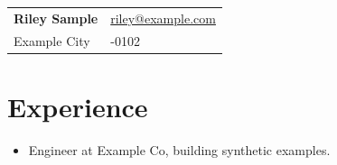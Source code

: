 \documentclass[11pt,letterpaper]{article}
\begin{document}
\noindent\begin{tabularx}{\textwidth}{>{\raggedright\arraybackslash}X >{\raggedleft\arraybackslash}X}
\textbf{\Large Riley Sample} & \href{mailto:riley@example.com}{riley@example.com} \\
Example City & 555-0102 \\
\end{tabularx}
\section*{Experience}
\begin{itemize}[leftmargin=*]
\item Engineer at Example Co, building synthetic examples.
\end{itemize}
\end{document}
